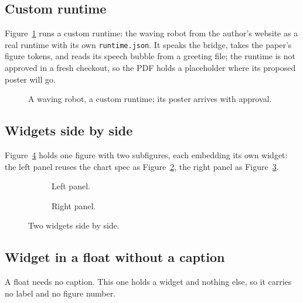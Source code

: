 \documentclass{article}
\theoremstyle{definition}
\begin{document}
\subsection{Custom runtime}
Figure~\ref{fig:wave} runs a custom runtime: the waving robot from the
author's website as a real runtime with its own \texttt{runtime.json}. It
speaks the bridge, takes the paper's figure tokens, and reads its speech
bubble from a greeting file; the runtime is not approved in a fresh
checkout, so the PDF holds a placeholder where its proposed poster will go.
\begin{figure}[ht]
\centering
\caption{A waving robot, a custom runtime; its poster arrives with approval.}
\label{fig:wave}
\end{figure}

\subsection{Widgets side by side}
Figure~\ref{fig:pair} holds one figure with two subfigures, each embedding
its own widget: the left panel reuses the chart spec as
Figure~\ref{fig:pair-a}, the right panel as Figure~\ref{fig:pair-b}.
\begin{figure}[ht]
\centering
\begin{subfigure}{0.45\textwidth}
\centering
{}
\caption{Left panel.}\label{fig:pair-a}
\end{subfigure}\hfill
\begin{subfigure}{0.45\textwidth}
\centering
{}
\caption{Right panel.}\label{fig:pair-b}
\end{subfigure}
\caption{Two widgets side by side.}
\label{fig:pair}
\end{figure}

\subsection{Widget in a float without a caption}
A float needs no caption. This one holds a widget and nothing else, so it
carries no label and no figure number.
\begin{figure}[ht]
\centering
{}
\end{figure}
\end{document}
